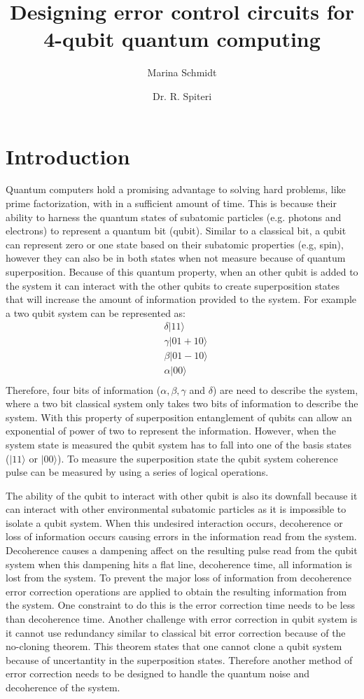 \documentclass{article}
\title{Designing error control circuits for 4-qubit quantum computing}
\author[1]{Marina Schmidt}
\author[1]{Dr. R. Spiteri}
\affil[1]{Department of Computer Science, University of Saskatchewan}
\affil[ ]{Email: \textit {mts299@mail.usask.ca}}
\affil[ ]{NSID: mts299}
\begin{document}
\maketitle

\section{Introduction}
 Quantum computers hold a promising advantage to solving hard problems, like prime factorization, with in a sufficient amount of time. This is because their ability to harness the quantum states of subatomic particles (e.g. photons and electrons) to represent a quantum bit (qubit). Similar to a classical bit, a qubit can represent zero or one state based on their subatomic properties (e.g, spin), however they can also be in both states when not measure because of quantum superposition. Because of this quantum property, when an other qubit is added to the system it can interact with the other qubits to create superposition states that will increase the amount of information provided to the system. For example a two qubit system can be represented as:
\begin{align*}
&\delta |11\big\rangle \\ 
&\gamma |01 + 10 \big\rangle \\
&\beta  |01 - 10 \big\rangle \\
&\alpha |00 \big\rangle \\
&\end{align*}
Therefore, four bits of information ($\alpha,\beta,\gamma$ and $\delta$) are need to describe the system, where a two bit classical system only takes two bits of information to describe the system. With this property of superposition entanglement of qubits can allow an exponential of power of two to represent the information. However, when the system state is measured the qubit system has to fall into one of the basis states ($|11\big\rangle$ or $|00 \big\rangle$). To measure the superposition state the qubit system coherence pulse can be measured by using a series of logical operations.

The ability of the qubit to interact with other qubit is also its downfall because it can interact with other environmental subatomic particles as it is impossible to isolate a qubit system. When this undesired interaction occurs, decoherence or loss of information occurs causing errors in the information read from the system. Decoherence causes a dampening affect on the resulting pulse read from the qubit system when this dampening hits a flat line, decoherence time, all information is lost from the system. To prevent the major loss of information from decoherence error correction operations are applied to obtain the resulting information from the system. One constraint to do this is the error correction time needs to be less than decoherence time. Another challenge with error correction in qubit system is it cannot use redundancy similar to classical bit error correction because of the no-cloning theorem. This theorem states that one cannot clone a qubit system because of uncertantity in the superposition states. Therefore another method of error correction needs to be designed to handle the quantum noise and decoherence of the system. 
\end{document}
